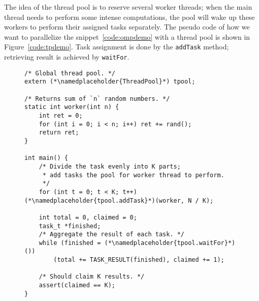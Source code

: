 \par The idea of the thread pool is to reserve several worker threads; when the
main thread needs to perform some intense computations, the pool will wake up
these workers to perform their assigned tasks separately. The pseudo code of how
we want to parallelize the snippet~\ref{code:ompdemo} with a thread pool
is shown in Figure~\ref{code:tpdemo}. Task assignment is done by the \texttt{addTask}
method; retrieving result is achieved by \texttt{waitFor}.

\begin{figure}[ht]
    \centering
\begin{lstlisting}[frame=tlbr]
/* Global thread pool. */
extern (*\namedplaceholder{ThreadPool}*) tpool;

/* Returns sum of `n` random numbers. */
static int worker(int n) {
    int ret = 0;
    for (int i = 0; i < n; i++) ret += rand();
    return ret;
}

int main() {
    /* Divide the task evenly into K parts; 
     * add tasks the pool for worker thread to perform. 
     */
    for (int t = 0; t < K; t++) (*\namedplaceholder{tpool.addTask}*)(worker, N / K);

    int total = 0, claimed = 0;
    task_t *finished;
    /* Aggregate the result of each task. */
    while (finished = (*\namedplaceholder{tpool.waitFor}*)()) 
        (total += TASK_RESULT(finished), claimed += 1);
    
    /* Should claim K results. */
    assert(claimed == K);
}
\end{lstlisting}
\end{figure}



